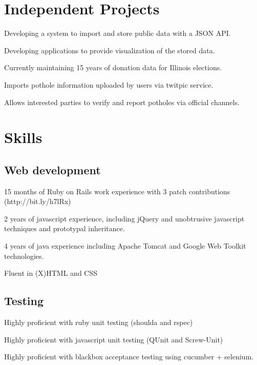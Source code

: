 \documentclass{resume}
\begin{document}
\section{Independent Projects}
\begin{compactitem}
  \item Developing a system to import and store public data with a JSON API.
  \item Developing applications to provide visualization of the stored data.
  \item Currently maintaining 15 years of donation data for Illinois elections.
\end{compactitem}

\begin{compactitem}
  \item Imports pothole information uploaded by users via twitpic service.
  \item Allows interested parties to verify and report potholes via official channels.
\end{compactitem}

\section{Skills}

\subsection{Web development}

\begin{compactitem}
  \item 15 months of Ruby on Rails work experience with 3 patch contributions (http://bit.ly/h7lRx)
  \item 2 years of javascript experience, including jQuery and unobtrusive javascript techniques and prototypal inheritance.
  \item 4 years of java experience including Apache Tomcat and Google Web Toolkit technologies.
  \item Fluent in (X)HTML and CSS
\end{compactitem}

\subsection{Testing}
\begin{compactitem}
  \item Highly proficient with ruby unit testing (shoulda and rspec)
  \item Highly proficient with javascript unit testing (QUnit and Screw-Unit)
  \item Highly proficient with blackbox acceptance testing using cucumber + selenium.
\end{compactitem}
\end{document}
